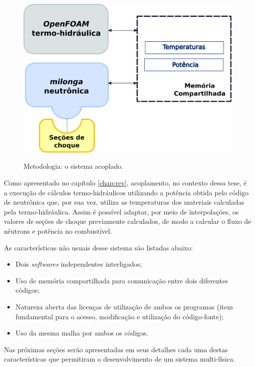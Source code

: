 \begin{figure}[htb]
  \caption{Metodologia: o sistema acoplado.}
  \centering\includegraphics[scale=0.6]{figuras/metodologia2.png}
  \label{metodoetapas}
\end{figure}

Como apresentado no capítulo \ref{chap:rev}, acoplamento, no contexto dessa tese, é a execução
de cálculos termo-hidráulicos utilizando a potência obtida pelo código de neutrônica que, por sua vez,
utiliza as temperaturas dos materiais calculadas pela termo-hidráulica. Assim é possível adaptar, por meio
de interpolações, os valores de seções de choque previamente calculados, de modo a calcular
o fluxo de nêutrons e potência no combustível.

As características não usuais desse sistema são listadas abaixo:

\begin{itemize}
\item Dois \textit{softwares} independentes interligados;
\item Uso de memória compartilhada para comunicação entre dois diferentes códigos;
\item Natureza aberta das licenças de utilização de ambos os programas (item fundamental para
  o acesso, modificação e utilização do código-fonte);
  \item Uso da mesma malha por ambos os códigos.
\end{itemize}

Nas próximas seções serão apresentadas em seus detalhes cada uma destas características que
permitiram o desenvolvimento de um sistema multi-física.

